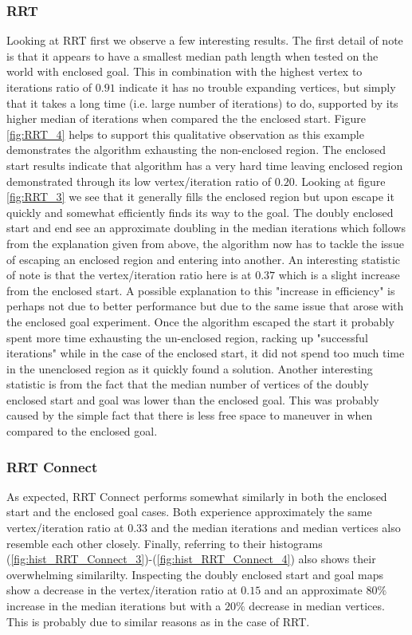 \documentclass{article}
\begin{document}
\subsubsection{RRT}\label{sec:RRT} %
Looking at RRT first we observe a few interesting results. The first detail
of note is that it appears to have a smallest median path length when tested
on the world with enclosed goal. This in combination with the highest vertex
to iterations ratio of $0.91$ indicate it has no trouble expanding vertices,
but simply that it takes a long time (i.e. large number of iterations) to do,
supported by its higher median of iterations when compared the the enclosed start.
Figure \ref{fig:RRT_4} helps to support this qualitative observation as this 
example demonstrates the algorithm exhausting the non-enclosed region.
The enclosed start results indicate that algorithm has a very hard time leaving
enclosed region demonstrated through its low vertex/iteration ratio of $0.20$.
Looking at figure \ref{fig:RRT_3} we see that it generally fills the enclosed
region but upon escape it quickly and somewhat efficiently finds its way to the
goal. The doubly enclosed start and end see an approximate doubling in the 
median iterations which follows from the explanation given from above, the algorithm now
has to tackle the issue of escaping an enclosed region and entering into another.
An interesting statistic of note is that the vertex/iteration ratio here is at
$0.37$ which is a slight increase from the enclosed start. A possible explanation
to this "increase in efficiency" is perhaps not due to better performance but due to 
the same issue that arose with the enclosed goal experiment. Once the algorithm 
escaped the start it probably spent more time exhausting the un-enclosed region,
racking up "successful iterations" while in the case of the enclosed start, it
did not spend too much time in the unenclosed region as it quickly found a solution.
Another interesting statistic is from the fact that the median number of vertices
of the doubly enclosed start and goal was lower than the enclosed goal. This 
was probably caused by the simple fact that there is less free space to maneuver in
when compared to the enclosed goal.
\subsubsection{RRT Connect}\label{sec:RRT Connect} %
As expected, RRT Connect performs somewhat similarly in both the enclosed start
and the enclosed goal cases. Both experience approximately the same
vertex/iteration ratio at $0.33$ and the median iterations and median vertices
also resemble each other closely. Finally, referring to their histograms 
(\ref{fig:hist_RRT_Connect_3})-(\ref{fig:hist_RRT_Connect_4}) also shows their
overwhelming similarilty.
Inspecting the doubly enclosed start and goal maps show a decrease in the 
vertex/iteration ratio at $0.15$ and an approximate $80\%$ increase in the 
median iterations but with a $20\%$ decrease in median vertices. This is probably
due to similar reasons as in the case of RRT.
\end{document}
